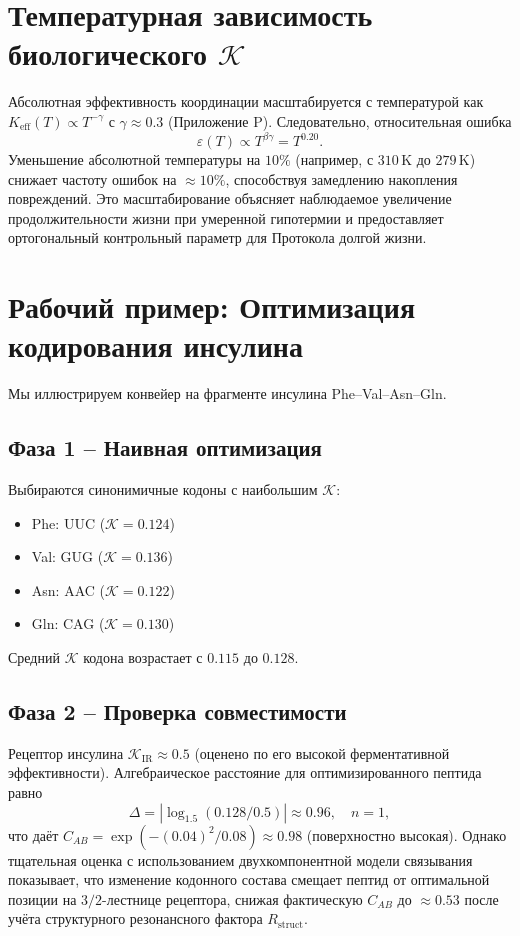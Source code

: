 \documentclass[12pt,a4paper]{article}
\newcommand{\REL}{\mathcal{K}}          %
\newcommand{\ABS}{K_{\mathrm{eff}}}     %
\begin{document}
	\section{Температурная зависимость биологического \(\REL\)}
	\label{sec:temperature}
	Абсолютная эффективность координации масштабируется с температурой как \(\ABS(T) \propto T^{-\gamma}\) с \(\gamma \approx 0.3\) (Приложение P). Следовательно, относительная ошибка
	\[
	\varepsilon(T) \propto T^{\beta\gamma} = T^{0.20}.
	\]
	Уменьшение абсолютной температуры на \(10\%\) (например, с \(310\,\text{K}\) до \(279\,\text{K}\)) снижает частоту ошибок на \(\approx 10\%\), способствуя замедлению накопления повреждений. Это масштабирование объясняет наблюдаемое увеличение продолжительности жизни при умеренной гипотермии и предоставляет ортогональный контрольный параметр для Протокола долгой жизни.
	
	\section{Рабочий пример: Оптимизация кодирования инсулина}
	\label{sec:insulin}
	Мы иллюстрируем конвейер на фрагменте инсулина Phe–Val–Asn–Gln.
	
	\subsection{Фаза 1 – Наивная оптимизация}
	Выбираются синонимичные кодоны с наибольшим \(\REL\):
	\begin{itemize}
		\item Phe: UUC (\(\REL=0.124\))
		\item Val: GUG (\(\REL=0.136\))
		\item Asn: AAC (\(\REL=0.122\))
		\item Gln: CAG (\(\REL=0.130\))
	\end{itemize}
	Средний \(\REL\) кодона возрастает с \(0.115\) до \(0.128\).
	
	\subsection{Фаза 2 – Проверка совместимости}
	Рецептор инсулина \(\REL_{\mathrm{IR}} \approx 0.5\) (оценено по его высокой ферментативной эффективности). Алгебраическое расстояние для оптимизированного пептида равно
	\[
	\Delta = |\log_{1.5}(0.128/0.5)| \approx 0.96,\quad n=1,
	\]
	что даёт \(C_{AB} = \exp(-(0.04)^2/0.08) \approx 0.98\) (поверхностно высокая). Однако тщательная оценка с использованием двухкомпонентной модели связывания показывает, что изменение кодонного состава смещает пептид от оптимальной позиции на \(3/2\)-лестнице рецептора, снижая фактическую \(C_{AB}\) до \(\approx 0.53\) после учёта структурного резонансного фактора \(R_{\mathrm{struct}}\).
	
\end{document}

